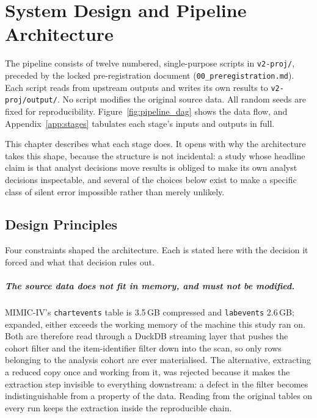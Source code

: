 \chapter{System Design and Pipeline Architecture}
\label{ch:design}

The pipeline consists of twelve numbered, single-purpose scripts in
\texttt{v2-proj/}, preceded by the locked pre-registration document
(\texttt{00\_preregistration.md}). Each script reads from upstream outputs and
writes its own results to \texttt{v2-proj/output/}. No script modifies the
original source data. All random seeds are fixed for reproducibility.
Figure~\ref{fig:pipeline_dag} shows the data flow, and
Appendix~\ref{app:stages} tabulates each stage's inputs and outputs in full.

This chapter describes what each stage does. It opens with why the architecture
takes this shape, because the structure is not incidental: a study whose
headline claim is that analyst decisions move results is obliged to make its own
analyst decisions inspectable, and several of the choices below exist to make a
specific class of silent error impossible rather than merely unlikely.


\section{Design Principles}
\label{sec:design_principles}

Four constraints shaped the architecture. Each is stated here with the decision
it forced and what that decision rules out.

\paragraph{The source data does not fit in memory, and must not be modified.}
MIMIC-IV's \texttt{chartevents} table is 3.5\,GB compressed and
\texttt{labevents} 2.6\,GB; expanded, either exceeds the working memory of the
machine this study ran on. Both are therefore read through a DuckDB streaming
layer that pushes the cohort filter and the item-identifier filter down into the
scan, so only rows belonging to the analysis cohort are ever materialised. The
alternative, extracting a reduced copy once and working from it, was
rejected because it makes the extraction step invisible to everything
downstream: a defect in the filter becomes indistinguishable from a property of
the data. Reading from the original tables on every run keeps the extraction
inside the reproducible chain.

